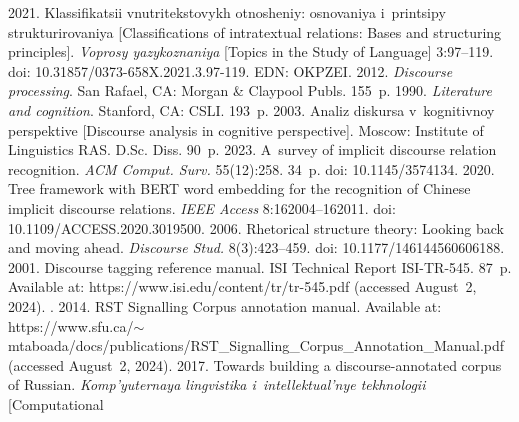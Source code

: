   \begin{multicols}{2}

\renewcommand{\bibname}{\protect\rmfamily References}

{\small\frenchspacing
 {%
 \begin{thebibliography}{99} 
 2021. Klassifikatsii vnutritekstovykh otnosheniy: osnovaniya 
i~printsipy strukturirovaniya [Classifications of intratextual relations: Bases and structuring 
principles]. \textit{Voprosy yazykoznaniya} [Topics in the Study of Language] 3:97--119. doi: 10.31857/0373-658X.2021.3.97-119. EDN: OKPZEI.
 2012. \textit{Discourse processing}. San Rafael, CA: Morgan \& Claypool Publs. 
155~p.
 1990. \textit{Literature and cognition}. Stanford, CA: CSLI. 193~p.
 2003. Analiz diskursa v~kognitivnoy perspektive [Discourse analysis in 
cognitive perspective]. Moscow: Institute of Linguistics RAS. D.Sc. Diss. 90~p.
 2023. A~survey of implicit discourse relation recognition. \textit{ACM 
Comput. Surv.} 55(12):258. 34~p. doi: 10.1145/3574134.
 2020. Tree framework with BERT word embedding for the 
recognition of Chinese implicit discourse relations. \textit{IEEE Access} 8:162004--162011. doi: 
10.1109/ACCESS.2020.3019500.
 2006. Rhetorical structure theory: Looking back and moving 
ahead. \textit{Discourse Stud.} 8(3):423--459. doi: 10.1177/146144560606188.
 2001. Discourse tagging reference manual. ISI Technical 
Report ISI-TR-545. 87~p.  Available at: {\sf https://www.isi.edu/content/tr/tr-545.pdf} (accessed August~2, 
2024).
. 2014. RST Signalling Corpus annotation manual. Available at: 
{\sf https://www.sfu.ca/\linebreak $\sim$mtaboada/docs/publications/RST\_Signalling\_Corpus\_\linebreak Annotation\_Manual.pdf} 
(accessed August~2, 2024).
 2017. Towards building a discourse-annotated corpus of Russian. 
\textit{Komp'yuternaya lingvistika i~intellektual'nye tekhnologii} 
[Computational 

\end{thebibliography}}}
\end{multicols}
